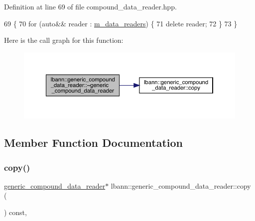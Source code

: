 Definition at line 69 of file compound\+\_\+data\+\_\+reader.\+hpp.


\begin{DoxyCode}
69                                            \{
70     \textcolor{keywordflow}{for} (\textcolor{keyword}{auto}&& reader : \hyperlink{classlbann_1_1generic__compound__data__reader_a9815e94ade5873415fd766e09d956d5b}{m\_data\_readers}) \{
71       \textcolor{keyword}{delete} reader;
72     \}
73   \}
\end{DoxyCode}
Here is the call graph for this function\+:\nopagebreak
\begin{figure}[H]
\begin{center}
\leavevmode
\includegraphics[width=350pt]{classlbann_1_1generic__compound__data__reader_a9fbabf1628a892500e1cd8f75738ce7d_cgraph}
\end{center}
\end{figure}


\subsection{Member Function Documentation}
\mbox{\label{classlbann_1_1generic__compound__data__reader_a197f5fd06679f777a709453830fcc4f9}} 
\subsubsection{\texorpdfstring{copy()}{copy()}}
{\footnotesize\ttfamily \hyperlink{classlbann_1_1generic__compound__data__reader}{generic\+\_\+compound\+\_\+data\+\_\+reader}$\ast$ lbann\+::generic\+\_\+compound\+\_\+data\+\_\+reader\+::copy (\begin{DoxyParamCaption}{ }\end{DoxyParamCaption}) const\hspace{0.3cm}{\ttfamily [override]}, {}}



